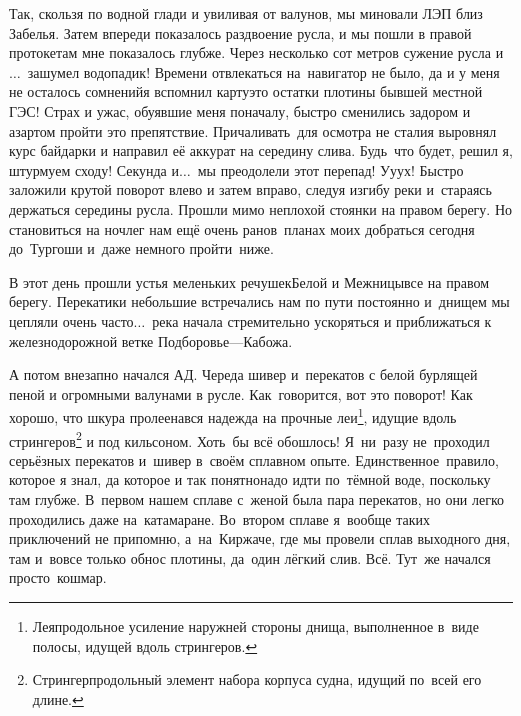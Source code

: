 Так, скользя по водной глади и увиливая от валунов, мы миновали ЛЭП близ Забелья. Затем впереди показалось раздвоение русла, и мы пошли в правой протоке\mdash там мне показалось глубже. Через несколько сот метров сужение русла и$\ldots$~зашумел водопадик! Времени отвлекаться на~навигатор не было, да и у меня не осталось сомнений\mdash я вспомнил карту\mdash это остатки плотины бывшей местной ГЭС! Страх и ужас, обуявшие меня поначалу, быстро сменились задором и азартом пройти это препятствие. Причаливать~для осмотра не стали\mdash я выровнял курс байдарки и направил её аккурат на середину слива. Будь~что будет, решил я, штурмуем сходу! Секунда и$\ldots$~мы преодолели этот перепад! У\sdash у\sdash ух! Быстро заложили крутой поворот влево и затем вправо, следуя изгибу реки и~стараясь держаться середины русла. Прошли мимо неплохой стоянки на правом берегу. Но становиться на ночлег нам ещё очень рано\mdash в~планах моих добраться сегодня до~Тургоши и~даже немного пройти~ниже. 

В этот день прошли устья меленьких речушек\mdash Белой и Межницы\mdash все на правом берегу. Перекатики небольшие встречались нам по пути постоянно и~днищем мы цепляли очень часто$\ldots$~река начала стремительно ускоряться и приближаться к железнодорожной ветке Подборовье\thinspace\nobreakdash---\thinspace Кабожа.

{
\renewcommand*{\thefootnote}{\arabic{footnote}}
А потом внезапно начался АД. Череда шивер и~перекатов с белой бурлящей пеной и огромными валунами в русле. Как~говорится, вот это поворот! Как хорошо, что шкура пролеена\mdash вся надежда на прочные леи\footnote{Лея\mdash продольное усиление наружней стороны днища, выполненное в~виде полосы, идущей вдоль стрингеров.}, идущие вдоль стрингеров\footnote{Стрингер\mdash продольный элемент набора корпуса судна, идущий по~всей его длине\cite{МорскойСправочник}.} и под кильсоном. Хоть~бы всё обошлось! Я~ни~разу не~проходил серьёзных перекатов и~шивер в~своём сплавном опыте. Единственное~правило, которое я знал, да которое и так понятно\mdash надо идти по~тёмной воде, поскольку там глубже. В~первом нашем сплаве с~женой была пара перекатов, но они легко проходились даже на~катамаране. Во~втором сплаве я~вообще таких приключений не припомню, а~на~Киржаче, где мы провели сплав выходного дня, там и~вовсе только обнос плотины, да~один лёгкий слив. Всё. Тут~же начался просто~кошмар.
}

